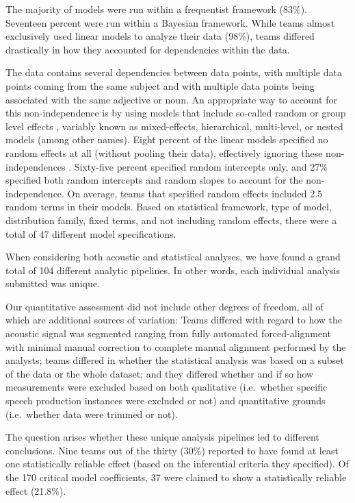 \documentclass[Review,times,sageh]{sagej}
\begin{document}
The majority of models were run within a frequentist framework (83\%).
Seventeen percent were run within a Bayesian framework.
While teams almost exclusively used linear models to analyze their data (98\%), teams differed drastically in how they accounted for dependencies within the data.

The data contains several dependencies between data points, with multiple data points coming from the same subject and with multiple data points being associated with the same adjective or noun.
An appropriate way to account for this non-independence is by using models that include so-called random or group level effects \citep[e.g.,][]{gelman2006data, schielzeth2009conclusions}, variably known as mixed-effects, hierarchical, multi-level, or nested models (among other names).
Eight percent of the linear models specified no random effects at all (without pooling their data), effectively ignoring these non-independences \citep{hurlbert1984pseudoreplication}.
Sixty-five percent specified random intercepts only, and 27\% specified both random intercepts and random slopes to account for the non-independence.
On average, teams that specified random effects included 2.5 random terms in their models.
Based on statistical framework, type of model, distribution family, fixed terms, and not including random effects, there were a total of 47 different model specifications.

When considering both acoustic and statistical analyses, we have found a grand total of 104 different analytic pipelines.
In other words, each individual analysis submitted was unique.

Our quantitative assessment did not include other degrees of freedom, all of which are additional sources of variation:
Teams differed with regard to how the acoustic signal was segmented ranging from fully automated forced-alignment with minimal manual correction to complete manual alignment performed by the analysts; teams differed in whether the statistical analysis was based on a subset of the data or the whole dataset; and they differed whether and if so how measurements were excluded based on both qualitative (i.e.~whether specific speech production instances were excluded or not) and quantitative grounds (i.e.~whether data were trimmed or not).

The question arises whether these unique analysis pipelines led to different conclusions.
Nine teams out of the thirty (30\%) reported to have found at least one statistically reliable effect (based on the inferential criteria they specified).
Of the 170 critical model coefficients, 37 were claimed to show a statistically reliable effect (21.8\%).
\end{document}
